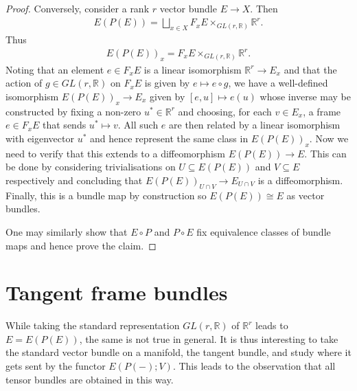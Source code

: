 \documentclass{article}
\begin{document}
\begin{theorem}
\begin{proof}
    Conversely, consider a rank $r$ vector bundle $E\to X$. Then
    \begin{align*}
      E(P(E)) = \bigsqcup_{x\in X} F_x E \times_{GL(r,\mathbb{R})}\mathbb{R}^r.
    \end{align*}
    Thus
    \begin{align*}
      E(P(E))_x = F_x E\times_{GL(r,\mathbb{R})}\mathbb{R}^r.
    \end{align*}
    Noting that an element $e\in F_x E$ is a linear isomorphism
    $\mathbb{R}^r\to E_x$ and that the action of $g\in GL(r,\mathbb{R})$
    on $F_x E$ is given by $e\mapsto e\circ g$,
    we have a well-defined isomorphism $E(P(E))_x\to E_x$ given by
    $[e,u]\mapsto e(u)$ whose inverse may be constructed by fixing
    a non-zero $u^*\in\mathbb{R}^r$ and choosing,
    for each $v\in E_x$, a frame $e\in F_x E$ that sends
    $u^*\mapsto v$. All such $e$ are then related by a linear isomorphism
    with eigenvector $u^*$ and hence represent the same class in
    $E(P(E))_x$.  Now we need to verify that this extends to
    a diffeomorphism $E(P(E))\to E$. This can be done by considering
    trivialisations on $U\subseteq E(P(E))$ and $V\subseteq E$ respectively and
    concluding that $E(P(E))_{U\cap V}\to E_{U\cap V}$ is a diffeomorphism.
    Finally, this is a bundle map by construction so $E(P(E))\cong E$
    as vector bundles.

    One may similarly show that $E\circ P$ and $P\circ E$ fix equivalence
    classes of bundle maps and hence prove the claim.
  \end{proof}
\end{theorem}

\section{Tangent frame bundles}

While taking the standard representation $GL(r,\mathbb{R})$
of $\mathbb{R}^r$ leads to $E=E(P(E))$, the same is not true in general.
It is thus interesting to take the standard vector bundle on a manifold,
the tangent bundle, and study where it gets sent by the functor $E(P(-); V)$.
This leads to the observation that all tensor bundles
are obtained in this way. \cite{joyce2019}
\end{document}
